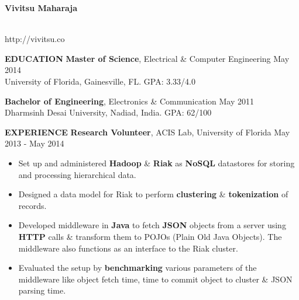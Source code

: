 \documentclass[10pt, letterpaper]{article}
\begin{document}
\begin{center}
\textbf{\Large Vivitsu Maharaja}
\date{}
\thispagestyle{empty}
\smallskip \\
http://vivitsu.co
\end{center}


\textbf{EDUCATION}
\smallskip
\newline
{\bf Master of Science}, Electrical \& Computer Engineering \hfill May 2014\\
University of Florida, Gainesville, FL. \hfill GPA: 3.33/4.0

{\bf Bachelor of Engineering}, Electronics \& Communication \hfill May 2011\\
Dharmsinh Desai University, Nadiad, India. \hfill GPA: 62/100

\textbf{EXPERIENCE}
\smallskip
\newline
\textbf{Research Volunteer}, ACIS Lab, University of Florida \hfill May 2013 - May 2014
\begin{itemize}
    \item Set up and administered \textbf{Hadoop} \& \textbf{Riak} as \textbf{NoSQL} 
datastores for storing and processing hierarchical data.
    \item Designed a data model for Riak to perform \textbf{clustering} \& \textbf{tokenization} of records. 
    \item Developed middleware in \textbf{Java} to fetch \textbf{JSON} objects 
from a server using \textbf{HTTP} calls \& transform them to POJOs (Plain Old Java Objects).
The middleware also functions as an interface to the Riak cluster.
    \item Evaluated the setup by \textbf{benchmarking} various parameters of the middleware like object fetch time, 
time to commit object to cluster \& JSON parsing time.  
\end{itemize}
\end{document}
